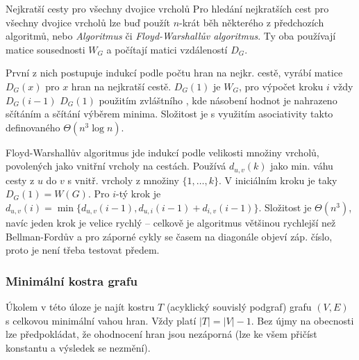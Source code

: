 \begin{poznamkaN}{Nejkratší cesty pro všechny dvojice vrcholů}
Pro hledání nejkratších cest pro všechny dvojice vrcholů lze buď použít $n$-krát běh některého z předchozích algoritmů, nebo \emph{Algoritmus } či \emph{Floyd-Warshallův algoritmus}. Ty oba používají matice sousednosti $W_G$ a počítají matici vzdáleností $D_G$. 

První z nich postupuje indukcí podle počtu hran na nejkr. cestě, vyrábí matice $D_G(x)$ pro $x$ hran na nejkratší cestě. $D_G(1)$ je $W_G$, pro výpočet kroku $i$ vždy $D_G(i-1)$  $D_G(1)$ použitím zvláštního , kde násobení hodnot je nahrazeno sčítáním a sčítání výběrem minima. Složitost je s využitím asociativity takto definovaného  $\Theta(n^3\log n)$.

Floyd-Warshallův algoritmus jde indukcí podle velikosti množiny vrcholů, povolených jako vnitřní vrcholy na cestách. Používá $d_{u,v}(k)$ jako min. váhu cesty z $u$ do $v$ s vnitř. vrcholy z množiny $\{1,\dots,k\}$. V iniciálním kroku je taky $D_G(1)=W(G)$. Pro $i$-tý krok je $d_{u,v}(i)=\min\{d_{u,v}(i-1),d_{u,i}(i-1)+d_{i,v}(i-1)\}$. Složitost je $\Theta(n^3)$, navíc jeden krok je velice rychlý -- celkově je algoritmus většinou rychlejší než Bellman-Fordův a pro záporné cykly se časem na diagonále objeví záp. číslo, proto je není třeba testovat předem.
\end{poznamkaN}

\subsubsection*{Minimální kostra grafu}

Úkolem v této úloze je najít kostru $T$ (acyklický souvislý podgraf) grafu $(V,E)$ s celkovou minimální vahou hran. Vždy platí $|T|=|V|-1$. Bez újmy na obecnosti lze předpokládat, že ohodnocení hran jsou nezáporná (lze ke všem přičíst konstantu a výsledek se nezmění).

